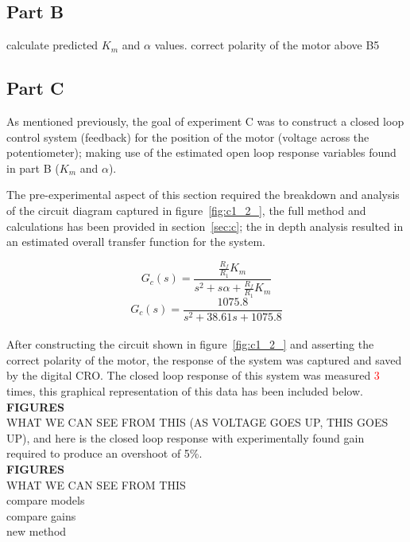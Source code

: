 \documentclass[11pt,a4paper]{article}
\begin{document}
\subsection{Part B}
calculate predicted $K_m$ and $\alpha$ values.
correct polarity of the motor
above
B5








\pagebreak
\subsection{Part C}
As mentioned previously, the goal of experiment C was to construct a closed loop control system (feedback) for the position of the motor (voltage across the potentiometer); making use of the estimated open loop response variables found in part B ($K_m$ and $\alpha$). 

The pre-experimental aspect of this section required the breakdown and analysis of the circuit diagram captured in figure~\ref{fig:c1_2_}, the full method and calculations has been provided in section~\ref{sec:c}; the in depth analysis resulted in an estimated overall transfer function for the system. 

$$ G_c(s) = \frac{\frac{R_f}{R_1}K_m} {s^2 + s\alpha + \frac{R_f}{R_1}K_m} $$
$$ G_c(s) = \frac{1075.8} {s^2 + 38.61s + 1075.8} $$\\


After constructing the circuit shown in figure~\ref{fig:c1_2_} and asserting the correct polarity of the motor, the response of the system was captured and saved by the digital CRO. The closed loop response of this system was measured \textcolor{red}{3} times, this graphical representation of this data has been included below.\\

\textbf{FIGURES}\\

WHAT WE CAN SEE FROM THIS (AS VOLTAGE GOES UP, THIS GOES UP), and here is the closed loop response with experimentally found gain required to produce an overshoot of 5\%.\\

\textbf{FIGURES}\\

WHAT WE CAN SEE FROM THIS\\

compare models\\
compare gains\\
new method\\
\end{document}
